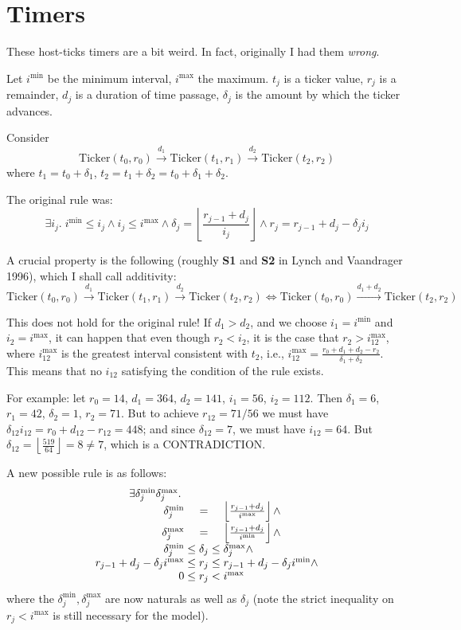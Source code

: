\documentclass{article}
\newcommand{\n}{^{\mathrm{min}}}
\newcommand{\x}{^{\mathrm{max}}}
\begin{document}
\section{Timers}

These host-ticks timers are a bit weird.  In fact, originally I had
them \emph{wrong}.

Let $i\n$ be the minimum interval, $i\x$ the maximum.  $t_j$ is a
ticker value, $r_j$ is a remainder, $d_j$ is a duration of time
passage, $\delta_j$ is the amount by which the ticker advances.

Consider
\[
\mathrm{Ticker}(t_0,r_0)\xrightarrow{d_1}
\mathrm{Ticker}(t_1,r_1)\xrightarrow{d_2}
\mathrm{Ticker}(t_2,r_2)
\]
where $t_1 = t_0+\delta_1$, $t_2=t_1+\delta_2 =
t_0+\delta_1+\delta_2$.

The original rule was:
\[
\exists i_j.\;
i\n\leq i_j \wedge i_j\leq i\x \wedge
\delta_j = \left\lfloor \frac{r_{j-1}+d_j}{i_j} \right\rfloor \wedge
r_j = r_{j-1}+d_j - \delta_j i_j
\]

A crucial property is the following (roughly \textbf{S1} and
\textbf{S2} in Lynch and Vaandrager 1996), which I shall call
additivity:
\[
\mathrm{Ticker}(t_0,r_0)\xrightarrow{d_1}
\mathrm{Ticker}(t_1,r_1)\xrightarrow{d_2}
\mathrm{Ticker}(t_2,r_2)
\Leftrightarrow
\mathrm{Ticker}(t_0,r_0)\xrightarrow{d_1+d_2}
\mathrm{Ticker}(t_2,r_2)
\]

This does not hold for the original rule!  If $d_1 > d_2$, and we
choose $i_1=i\n$ and $i_2=i\x$, it can happen that even though $r_2 <
i_2$, it is the case that $r_2 > i\x_{12}$, where $i\x_{12}$ is the
greatest interval consistent with $t_2$, i.e., $i\x_{12} =
\frac{r_0+d_1+d_2-r_2}{\delta_1+\delta_2}$.  This means that no
$i_{12}$ satisfying the condition of the rule exists.

For example: let $r_0 = 14$, $d_1=364$, $d_2=141$, $i_1=56$,
$i_2=112$.  Then $\delta_1=6$, $r_1=42$, $\delta_2=1$, $r_2=71$.  But
to achieve $r_{12}=71/56$ we must have
$\delta_{12}i_{12}=r_0+d_{12}-r_{12}=448$; and since $\delta_{12}=7$,
we must have $i_{12}=64$.  But $\delta_{12}=\left\lfloor \frac{519}{64}
\right\rfloor = 8 \neq 7$, which is a CONTRADICTION.

A new possible rule is as follows:
\[
\begin{array}{r@{}c@{}l}
\exists \delta\n_j \delta\x_j.\;\\
\delta\n_j &=& \left\lfloor \frac{r_{j-1}+d_j}{i\x} \right\rfloor \wedge\\[1ex]
\delta\x_j &=& \left\lfloor \frac{r_{j-1}+d_j}{i\n} \right\rfloor \wedge\\
\delta\n_j &{}\leq \delta_j\leq{}&\delta\x_j \wedge\\
r_{j-1}+d_j-\delta_j i\x &{}\leq r_j \leq {}&r_{j-1}+d_j-\delta_j i\n \wedge\\
0 &{}\leq r_j <{}& i\x
\end{array}
\]
where the $\delta\n_j, \delta\x_j$ are now naturals as well as
$\delta_j$ (note the strict inequality on $r_j < i\x$ is still
necessary for the model).
\end{document}
